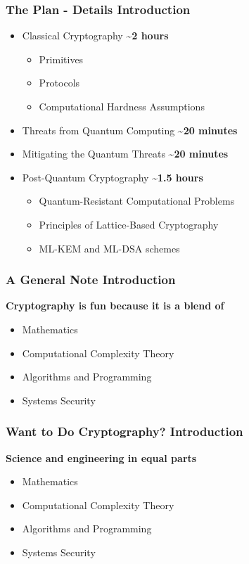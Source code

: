 \documentclass[12pt]{beamer}
\newcommand{\FrameTitle}[2]{\frametitle{#1 \hfill \small\textnormal{\textcolor{midgray}{#2}}}}
\newcommand{\vsp}{\vspace*{1em}}
\begin{document}
\begin{frame}\FrameTitle{The Plan - Details}{Introduction}
    \begin{itemize}
        \item Classical Cryptography \hfill \textbf{\textasciitilde 2 hours}
        \begin{itemize}
            \item Primitives
            \item Protocols
            \item Computational Hardness Assumptions
        \end{itemize} \vsp
        \item Threats from Quantum Computing \hfill \textbf{\textasciitilde 20 minutes} \vsp
        \item Mitigating the Quantum Threats \hfill \textbf{\textasciitilde 20 minutes} \vsp
        \item Post-Quantum Cryptography \hfill \textbf{\textasciitilde 1.5 hours}
        \begin{itemize}
            \item Quantum-Resistant Computational Problems
            \item Principles of Lattice-Based Cryptography
            \item ML-KEM and ML-DSA schemes
        \end{itemize}
    \end{itemize}
\end{frame}


\begin{frame}\FrameTitle{A General Note}{Introduction}
    \large\textbf{Cryptography is fun because it is a blend of}
    \begin{itemize}
        \item[] \hspace*{2em} Mathematics
        \item[] \hspace*{2em} Computational Complexity Theory
        \item[] \hspace*{2em} Algorithms and Programming
        \item[] \hspace*{2em} Systems Security
    \end{itemize}
\end{frame}

\begin{frame}\FrameTitle{Want to Do  Cryptography?}{Introduction}
    \large\textbf{Science and engineering in equal parts}
    \begin{itemize}
        \item[] \hspace*{2em} Mathematics
        \item[] \hspace*{2em} Computational Complexity Theory
        \item[] \hspace*{2em} Algorithms and Programming
        \item[] \hspace*{2em} Systems Security
    \end{itemize}
\end{frame}
\end{document}
